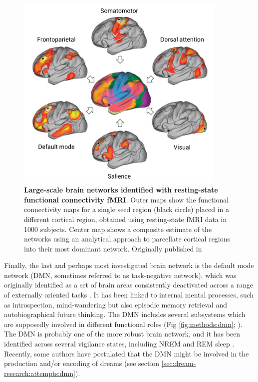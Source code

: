 \begin{figure}[htb]
    \centering
	\includegraphics[width=0.9\textwidth]{Fig/Methods/fMRI_Networks/fMRI_Networks.png}
	\caption[Large-scale brain networks]{\textbf{Large-scale brain networks identified with resting-state functional connectivity fMRI}. Outer maps show the functional connectivity maps for a single seed region (black circle) placed in a different cortical region, obtained using resting-state fMRI data in 1000 subjects. Center map shows a composite estimate of the networks using an analytical approach to parcellate cortical regions into their most dominant network. Originally published in \citet{buckner_opportunities_2013}}
	\label{fig:methods:networks}
\end{figure}

Finally, the last and perhaps most investigated brain network is the default mode network (DMN, sometimes referred to as task-negative network), which was originally identified as a set of brain areas consistently deactivated across a range of externally oriented tasks \citep{raichle_default_2001}. It has been linked to internal mental processes, such as introspection, mind-wandering but also episodic memory retrieval and autobiographical future thinking. The DMN includes several subsystems which are supposedly involved in different functional roles  (Fig \ref{fig:methods:dmn}; \citealp{andrews-hanna_functional-anatomic_2010}). The DMN is probably one of the more robust brain network, and it has been identified across several vigilance states, including NREM and REM sleep \citep{horovitz_decoupling_2009, larson-prior_cortical_2009, larson-prior_modulation_2011, wu_variations_2012}. Recently, some authors have postulated that the DMN might be involved in the production and/or encoding of dreams (see section \ref{sec:dream-research:attempts:dmn}).

